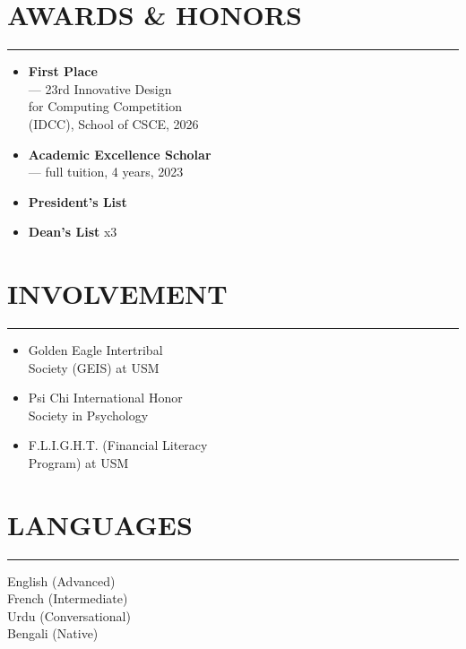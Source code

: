 \documentclass[10pt, letterpaper]{article}
\begin{document}
\begin{minipage}[t]{0.25\textwidth}
{\vspace{3pt}

\section*{AWARDS \& HONORS}\vspace{-2pt}\hrule\vspace{3pt}
{\small
\begin{itemize}[label=$\circ$, nosep, leftmargin=8pt]
    \item \textbf{First Place} \\--- 23rd Innovative Design \\for Computing Competition \\(IDCC), School of CSCE, 2026
    \item \textbf{Academic Excellence Scholar} \\--- full tuition, 4 years, 2023
    \item \textbf{President's List}
    \item \textbf{Dean's List} x3
\end{itemize}
}

\vspace{3pt}

\section*{INVOLVEMENT}\vspace{-2pt}\hrule\vspace{3pt}
{\small
\begin{itemize}[label=$\circ$, nosep, leftmargin=8pt]
    \item Golden Eagle Intertribal \\ Society (GEIS) at USM
    \item Psi Chi International Honor \\ Society in Psychology
    \item F.L.I.G.H.T. (Financial Literacy \\ Program) at USM
\end{itemize}
}

\vspace{3pt}

\section*{LANGUAGES}\vspace{-2pt}\hrule\vspace{3pt}
{\small
English (Advanced) \\
French (Intermediate) \\
Urdu (Conversational) \\
Bengali (Native)
}

}
\end{minipage}
\end{document}
